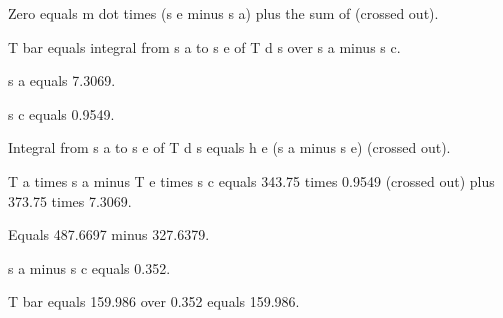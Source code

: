 Zero equals m dot times (s e minus s a) plus the sum of (crossed out).

T bar equals integral from s a to s e of T d s over s a minus s c.

s a equals 7.3069.

s c equals 0.9549.

Integral from s a to s e of T d s equals h e (s a minus s e) (crossed out).

T a times s a minus T e times s c equals 343.75 times 0.9549 (crossed out) plus 373.75 times 7.3069.

Equals 487.6697 minus 327.6379.

s a minus s c equals 0.352.

T bar equals 159.986 over 0.352 equals 159.986.